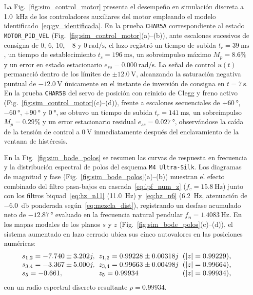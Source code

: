 La Fig.~\ref{fig:sim_control_motor} presenta el desempeño en simulación discreta a \qty{1.0}{\kilo\hertz} de los controladores auxiliares del motor empleando el modelo identificado~\eqref{eq:gv_identificada}. En la prueba \texttt{CHAR5A} correspondiente al estado \texttt{MOTOR\_PID\_VEL} (Fig.~\ref{fig:sim_control_motor}(a)--(b)), ante escalones sucesivos de consigna de $0$, $6$, $10$, $-8$ y $\qty{0}{\radian\per\second}$, el lazo registró un tiempo de subida $t_r=\qty{39}{\milli\second}$, un tiempo de establecimiento $t_s=\qty{196}{\milli\second}$, un sobreimpulso máximo $M_p=8.6\%$ y un error en estado estacionario $e_{ss}=\qty{0.000}{\radian\per\second}$. La señal de control $u(t)$ permaneció dentro de los límites de $\pm\qty{12.0}{\volt}$, alcanzando la saturación negativa puntual de $\qty{-12.0}{\volt}$ únicamente en el instante de inversión de consigna en $t=\qty{7}{\second}$. En la prueba \texttt{CHAR5B} del servo de posición con reinicio de Clegg y freno activo (Fig.~\ref{fig:sim_control_motor}(c)--(d)), frente a escalones secuenciales de $+\qty{60}{\degree}$, $-\qty{60}{\degree}$, $+\qty{90}{\degree}$ y $\qty{0}{\degree}$, se obtuvo un tiempo de subida $t_r=\qty{141}{\milli\second}$, un sobreimpulso $M_p=0.29\%$ y un error estacionario residual $e_{ss}=\qty{0.027}{\degree}$, observándose la caída de la tensión de control a $\qty{0}{\volt}$ inmediatamente después del enclavamiento de la ventana de histéresis.

En la Fig.~\ref{fig:sim_bode_polos} se resumen las curvas de respuesta en frecuencia y la distribución espectral de polos del esquema \texttt{M4 Ultra-Silk}. Los diagramas de magnitud y fase (Fig.~\ref{fig:sim_bode_polos}(a)--(b)) muestran el efecto combinado del filtro pasa-bajos en cascada~\eqref{eq:lpf_num_z} ($f_c=\qty{15.8}{\hertz}$) junto con los filtros biquad~\eqref{eq:hz_n11} (\qty{11.0}{\hertz}) y~\eqref{eq:hz_n6} (\qty{6.2}{\hertz}, atenuación de \qty{-6.0}{\decibel} ponderada según~\eqref{eq:mezcla_dist}), registrando un desfase acumulado neto de $\qty{-12.87}{\degree}$ evaluado en la frecuencia natural pendular $f_n=\qty{1.4083}{\hertz}$. En los mapas modales de los planos $s$ y $z$ (Fig.~\ref{fig:sim_bode_polos}(c)--(d)), el sistema aumentado en lazo cerrado ubica sus cinco autovalores en las posiciones numéricas:
\begin{equation}
\resizebox{0.89\columnwidth}{!}{$\displaystyle
    \begin{array}{@{}l@{\;\;}l@{\;\;}l@{}}
        s_{1,2} = -7.740 \pm 3.202j, & z_{1,2} = 0.99228 \pm 0.00318j & (|z|=0.99229), \\
        s_{3,4} = -3.367 \pm 5.000j, & z_{3,4} = 0.99663 \pm 0.00498j & (|z|=0.99664), \\
        s_5 = -0.661, & z_5 = 0.99934 & (|z|=0.99934),
    \end{array}
$}
    \label{eq:polos_m4}
\end{equation}
con un radio espectral discreto resultante $\rho=0.99934$.

